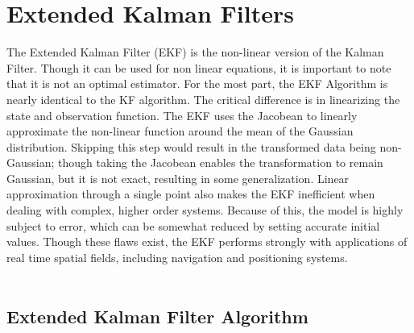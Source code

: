 \chapter{Extended Kalman Filters}
\label{Extended Kalman Filters}

The Extended Kalman Filter (EKF) is the non-linear version of the Kalman Filter. Though it can be used for non linear equations, it is important to note that it is not an optimal estimator. For the most part, the EKF Algorithm is nearly identical to the KF algorithm. The critical difference is in linearizing the state and observation function. The EKF uses the Jacobean to linearly approximate the non-linear function around the mean of the Gaussian distribution. Skipping this step would result in the transformed data being non-Gaussian; though taking the Jacobean enables the transformation to remain Gaussian, but it is not exact, resulting in some generalization. Linear approximation through a single point also makes the EKF inefficient when dealing with complex, higher order systems. Because of this, the model is highly subject to error, which can be somewhat reduced by setting accurate initial values. Though these flaws exist, the EKF performs strongly with applications of real time spatial fields, including navigation and positioning systems.  \\ \\

\section{Extended Kalman Filter Algorithm}



